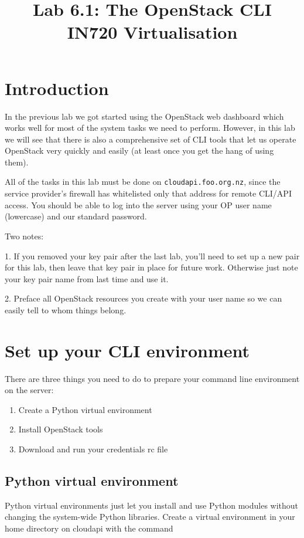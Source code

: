 \documentclass{article}
\begin{document}
\title{Lab 6.1: The OpenStack CLI \\ IN720 Virtualisation}
\date{}
\maketitle

\section*{Introduction}
In the previous lab we got started using the OpenStack web dashboard which works well for most of the system tasks we need to perform. However, in this lab we will see that there is also a comprehensive set of CLI tools that let us operate OpenStack very quickly and easily (at least once you get the hang of using them).

All of the tasks in this lab must be done on \texttt{cloudapi.foo.org.nz}, since the service provider's firewall has whitelisted only that address for remote CLI/API access. You should be able to log into the server using your OP user name (lowercase) and our standard password.

Two notes:

1. If you removed your key pair after the last lab, you'll need to set up a new pair for this lab, then leave that key pair in place for future work. Otherwise just note your key pair name from last time and use it.

2. Preface all OpenStack resources you create with your user name so we can easily tell to whom things belong.

\section{Set up your CLI environment}
There are three things you need to do to prepare your command line environment on the server:

\begin{enumerate}
 \item Create a Python virtual environment
 \item Install OpenStack tools
 \item Download and run your credentials rc file
\end{enumerate}

 \subsection{Python virtual environment}
  Python virtual environments just let you install and use Python modules without changing the system-wide Python libraries. Create a virtual environment in your home directory on cloudapi with the command 
  
\end{document}
